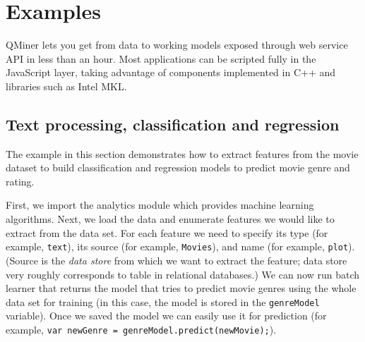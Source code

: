 \documentclass{article} %
\begin{document}
\section{Examples}

QMiner lets you get from data to working models exposed through web service API in less than an hour. Most applications can be scripted fully in the JavaScript layer, taking advantage of components implemented in C++ and libraries such as Intel MKL.

\subsection{Text processing, classification and regression}

The example in this section demonstrates how to extract features from the movie dataset to build classification and regression models to predict movie genre and rating.

First, we import the analytics module which provides machine learning algorithms. Next, we load the data and enumerate features we would like to extract from the data set. For each feature we need to specify its type (for example, \texttt{text}), its source (for example, \texttt{Movies}), and name (for example, \texttt{plot}). (Source is the \emph{data store} from which we want to extract the feature; data store very roughly corresponds to table in relational databases.) We can now run batch learner that returns the model that tries to predict movie genres using the whole data set for training (in this case, the model is stored in the \texttt{genreModel} variable). Once we saved the model we can easily use it for prediction (for example, \texttt{var newGenre = genreModel.predict(newMovie);}).
\end{document}
